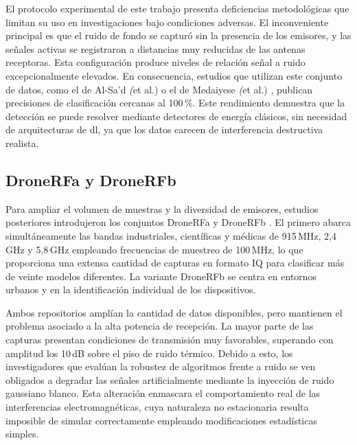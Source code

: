 El protocolo experimental de este trabajo presenta deficiencias metodológicas que limitan su uso en investigaciones bajo condiciones adversas. El inconveniente principal es que el ruido de fondo se capturó sin la presencia de los emisores, y las señales activas se registraron a distancias muy reducidas de las antenas receptoras. Esta configuración produce niveles de relación señal a ruido excepcionalmente elevados. En consecuencia, estudios que utilizan este conjunto de datos, como el de Al-Sa'd \textit(et al.) \cite{al-sad_rf-based_2019} o el de Medaiyese \textit(et al.) \cite{medaiyese_machine_2021}, publican precisiones de clasificación cercanas al 100\,\%. Este rendimiento demuestra que la detección se puede resolver mediante detectores de energía clásicos, sin necesidad de arquitecturas de \gls{dl}, ya que los datos carecen de interferencia destructiva realista.

\subsection{DroneRFa y DroneRFb}
\label{subsec:dronerf_ab}

Para ampliar el volumen de muestras y la diversidad de emisores, estudios posteriores introdujeron los conjuntos DroneRFa y DroneRFb \cite{yu_open_2024, liu_method_2026}. El primero abarca simultáneamente las bandas industriales, científicas y médicas de 915\,MHz, 2,4\,GHz y 5,8\,GHz empleando frecuencias de muestreo de 100\,MHz, lo que proporciona una extensa cantidad de capturas en formato IQ para clasificar más de veinte modelos diferentes. La variante DroneRFb se centra en entornos urbanos y en la identificación individual de los dispositivos.

Ambos repositorios amplían la cantidad de datos disponibles, pero mantienen el problema asociado a la alta potencia de recepción. La mayor parte de las capturas presentan condiciones de transmisión muy favorables, superando con amplitud los 10\,dB sobre el piso de ruido térmico. Debido a esto, los investigadores que evalúan la robustez de algoritmos frente a ruido se ven obligados a degradar las señales artificialmente mediante la inyección de ruido gaussiano blanco. Esta alteración enmascara el comportamiento real de las interferencias electromagnéticas, cuya naturaleza no estacionaria resulta imposible de simular correctamente empleando modificaciones estadísticas simples.

